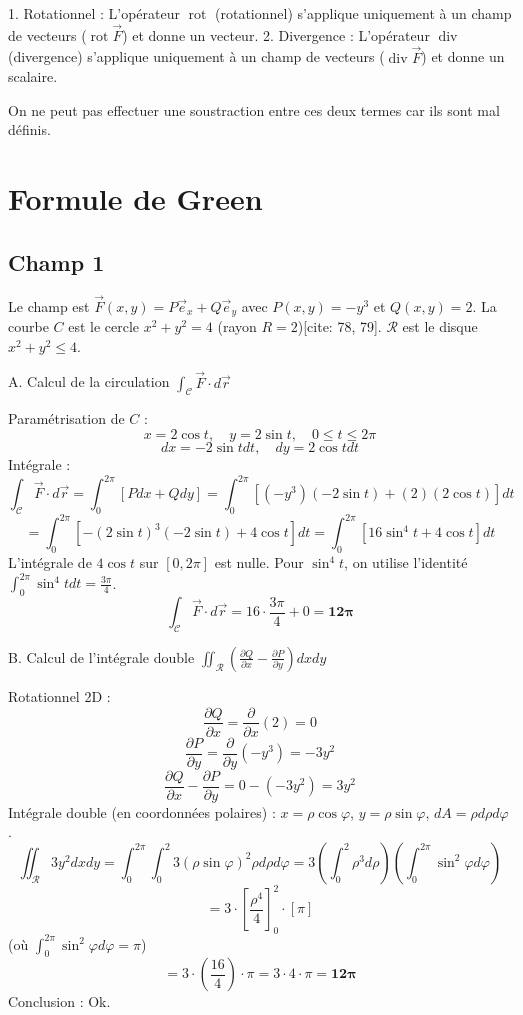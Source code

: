 \documentclass[french]{yLectureNote}
\renewcommand{\vec}{\overrightarrow}
\begin{document}
1.  Rotationnel : L'opérateur $\operatorname{rot}$ (rotationnel) s'applique uniquement à un champ de vecteurs ($\operatorname{rot}\vec{F}$) et donne un vecteur.
2.  Divergence : L'opérateur $\operatorname{div}$ (divergence) s'applique uniquement à un champ de vecteurs ($\operatorname{div}\vec{F}$) et donne un scalaire.

On ne peut pas effectuer une soustraction entre ces deux termes car ils sont mal définis.
\section{Formule de Green}
\subsection{Champ 1}

Le champ est $\vec{F}(x,y) = P\vec{e}_x + Q\vec{e}_y$ avec $P(x,y) = -y^3$ et $Q(x,y) = 2$.
La courbe $C$ est le cercle $x^2 + y^2 = 4$ (rayon $R=2$)[cite: 78, 79]. $\mathcal{R}$ est le disque $x^2 + y^2 \le 4$.

A. Calcul de la circulation $\int_{\mathcal{C}}\vec{F}\cdot d\vec{r}$

Paramétrisation de $C$ :
$$
x = 2\cos t, \quad y = 2\sin t, \quad 0 \le t \le 2\pi
$$
$$
dx = -2\sin t dt, \quad dy = 2\cos t dt
$$
Intégrale :
$$
\int_{\mathcal{C}}\vec{F}\cdot d\vec{r} = \int_{0}^{2\pi} [P dx + Q dy] = \int_{0}^{2\pi} [(-y^3)(-2\sin t) + (2)(2\cos t)] dt
$$
$$
= \int_{0}^{2\pi} [-(2\sin t)^3 (-2\sin t) + 4\cos t] dt = \int_{0}^{2\pi} [16\sin^4 t + 4\cos t] dt
$$
L'intégrale de $4\cos t$ sur $[0, 2\pi]$ est nulle. Pour $\sin^4 t$, on utilise l'identité $\int_{0}^{2\pi} \sin^4 t dt = \frac{3\pi}{4}$.
$$
\int_{\mathcal{C}}\vec{F}\cdot d\vec{r} = 16 \cdot \frac{3\pi}{4} + 0 = \mathbf{12\pi}
$$

B. Calcul de l'intégrale double $\iint_{\mathcal{R}}(\frac{\partial Q}{\partial x}-\frac{\partial P}{\partial y})dx dy$

Rotationnel 2D :
$$
\frac{\partial Q}{\partial x} = \frac{\partial}{\partial x}(2) = 0
$$
$$
\frac{\partial P}{\partial y} = \frac{\partial}{\partial y}(-y^3) = -3y^2
$$
$$
\frac{\partial Q}{\partial x}-\frac{\partial P}{\partial y} = 0 - (-3y^2) = 3y^2
$$
Intégrale double (en coordonnées polaires) : $x=\rho \cos \varphi$, $y=\rho \sin \varphi$, $dA = \rho d\rho d\varphi$.
$$
\iint_{\mathcal{R}} 3y^2 dx dy = \int_{0}^{2\pi} \int_{0}^{2} 3(\rho \sin \varphi)^2 \rho d\rho d\varphi = 3 \left(\int_{0}^{2} \rho^3 d\rho\right) \left(\int_{0}^{2\pi} \sin^2 \varphi d\varphi\right)
$$
$$
= 3 \cdot \left[\frac{\rho^4}{4}\right]_{0}^{2} \cdot \left[\pi\right]
$$
(où $\int_{0}^{2\pi} \sin^2 \varphi d\varphi = \pi$)
$$
= 3 \cdot \left(\frac{16}{4}\right) \cdot \pi = 3 \cdot 4 \cdot \pi = \mathbf{12\pi}
$$
Conclusion : Ok.
\end{document}
